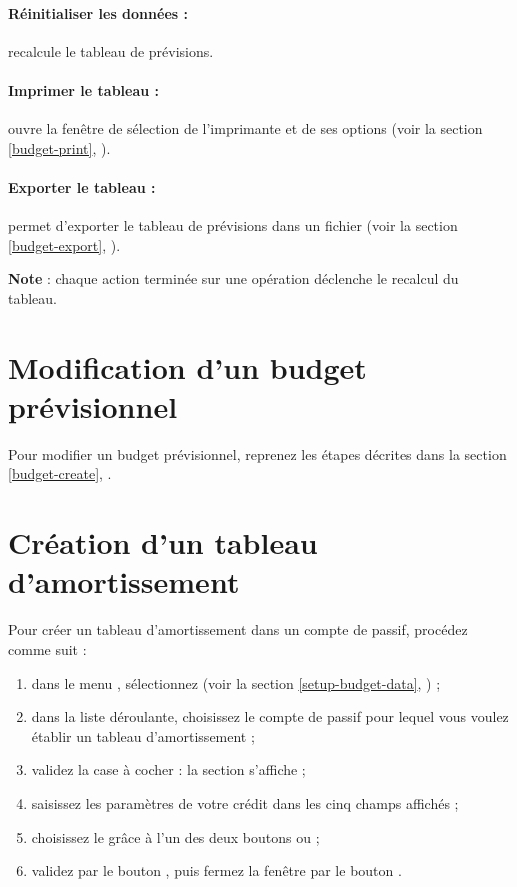 \paragraph{Réinitialiser les données :}recalcule le tableau de prévisions.

\paragraph{Imprimer le tableau :}ouvre la fenêtre de sélection de l'imprimante et de ses options (voir la section \ref{budget-print}, ).

\paragraph{Exporter le tableau :}permet d'exporter le tableau de prévisions dans un fichier (voir la section \vref{budget-export}, ).

\textbf{Note} : chaque action terminée sur une opération déclenche le recalcul du tableau. 


\section{Modification d'un budget prévisionnel\label{budget-modify}}


Pour modifier un budget prévisionnel, reprenez les étapes décrites dans la section \vref{budget-create}, . 


\section{Création d'un tableau d'amortissement\label{budget-amortizationCreate}}


Pour créer un tableau d'amortissement dans un compte de passif, procédez comme suit :

\begin{enumerate}
	\item dans le menu , sélectionnez  (voir la section \vref{setup-budget-data}, ) ;
	\item dans la liste déroulante, choisissez le compte de passif pour lequel vous voulez établir un tableau d'amortissement ;
	\item validez la case à cocher  : la section  s'affiche ;
	\item saisissez les paramètres de votre crédit dans les cinq champs affichés ;
	\item choisissez le  grâce à l'un des deux boutons  ou  ;
	\item validez par le bouton , puis fermez la fenêtre par le bouton .
\end{enumerate}


